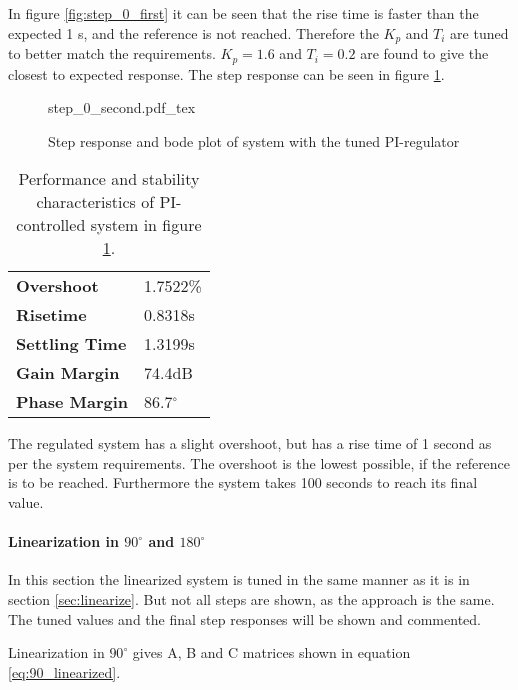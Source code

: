 \documentclass[../../../Main]{subfiles}
\begin{document}
In figure \ref{fig:step_0_first} it can be seen that the rise time is faster than the expected 1 s, and the reference is not reached. Therefore the $K_p$ and $T_i$ are tuned to better match the requirements. $K_p = 1.6$ and $T_i=0.2$ are found to give the closest to expected response. The step response can be seen in figure \ref{fig:step_0_second}.

\begin{figure}[H]
\centering
\def\svgwidth{\textwidth}
{step_0_second.pdf_tex}
\caption{Step response and bode plot of system with the tuned PI-regulator}
\label{fig:step_0_second}
\end{figure}


\begin{table}[h]
	 \centering
	 \begin{tabular}{ll}
		 \textbf{Overshoot} & 1.7522\%\\
		 \textbf{Risetime}  & 0.8318s\\
		 \textbf{Settling Time} & 1.3199s\\
		 \textbf{Gain Margin} & 74.4dB\\
		 \textbf{Phase Margin} & 86.7$^\circ$
	 \end{tabular}
	 \caption{Performance and stability characteristics of PI-controlled system in figure \ref{fig:step_0_second}.}
	 \label{tab:performance_0_2}
\end{table}



The regulated system has a slight overshoot, but has a rise time of 1 second as per the system requirements. The overshoot is the lowest possible, if the reference is to be reached. Furthermore the system takes 100 seconds to reach its final value.

\paragraph{Linearization in $90^\circ$ and $180^\circ$}
In this section the linearized system is tuned in the same manner as it is in section \ref{sec:linearize}. But not all steps are shown, as the approach is the same. The tuned values and the final step responses will be shown and commented.

Linearization in $90^\circ$ gives A, B and C matrices shown in equation \ref{eq:90_linearized}.
\end{document}
